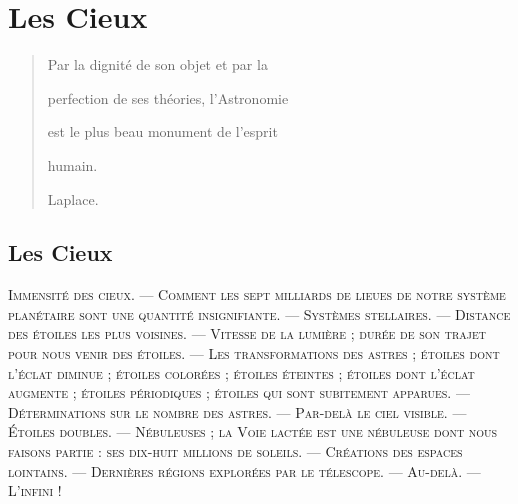 \documentclass[a4paper, 11pt, oneside]{article}
\begin{document}
\section{Les Cieux}
\begin{quotation}
Par la dignité de son objet et par la

perfection de ses théories, l'Astronomie

est le plus beau monument de l'esprit

humain.

\hspace*{5mm}Laplace.
\end{quotation}

\bigskip

\subsection{Les Cieux}
\begin{center}
\scshape
\small
Immensité des cieux. --- Comment les sept milliards de lieues de notre système planétaire sont une quantité insignifiante. --- Systèmes stellaires. --- Distance des étoiles les plus voisines. --- Vitesse de la lumière ; durée de son trajet pour nous venir des étoiles. --- Les transformations des astres ; étoiles dont l'éclat diminue ; étoiles colorées ; étoiles éteintes ; étoiles dont l'éclat augmente ; étoiles périodiques ; étoiles qui sont subitement apparues. --- Déterminations sur le nombre des astres. --- Par-delà le ciel visible. --- Étoiles doubles. --- Nébuleuses ; la Voie lactée est une nébuleuse dont nous faisons partie : ses dix-huit millions de soleils. --- Créations des espaces lointains. --- Dernières régions explorées par le télescope. --- Au-delà. --- L'infini !
\end{center}
\end{document}

